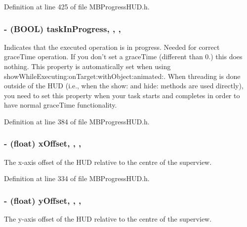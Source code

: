 Definition at line 425 of file M\+B\+Progress\+H\+U\+D.\+h.

\hypertarget{interface_m_b_progress_h_u_d_a6077ea42c37c18b3058ed63ac10ede8f}{
\subsubsection[{task\+In\+Progress}]{\setlength{\rightskip}{0pt plus 5cm}-\/ (B\+O\+O\+L) task\+In\+Progress\hspace{0.3cm}{\ttfamily [read]}, {\ttfamily [write]}, {\ttfamily [atomic]}, {\ttfamily [assign]}}}\label{interface_m_b_progress_h_u_d_a6077ea42c37c18b3058ed63ac10ede8f}
Indicates that the executed operation is in progress. Needed for correct grace\+Time operation. If you don't set a grace\+Time (different than 0.) this does nothing. This property is automatically set when using show\+While\+Executing\+:on\+Target\+:with\+Object\+:animated\+:. When threading is done outside of the H\+U\+D (i.\+e., when the show\+: and hide\+: methods are used directly), you need to set this property when your task starts and completes in order to have normal grace\+Time functionality. 

Definition at line 384 of file M\+B\+Progress\+H\+U\+D.\+h.

\hypertarget{interface_m_b_progress_h_u_d_a4e6ee114c04b90ced1a253a6d33ba785}{
\subsubsection[{x\+Offset}]{\setlength{\rightskip}{0pt plus 5cm}-\/ (float) x\+Offset\hspace{0.3cm}{\ttfamily [read]}, {\ttfamily [write]}, {\ttfamily [atomic]}, {\ttfamily [assign]}}}\label{interface_m_b_progress_h_u_d_a4e6ee114c04b90ced1a253a6d33ba785}
The x-\/axis offset of the H\+U\+D relative to the centre of the superview. 

Definition at line 334 of file M\+B\+Progress\+H\+U\+D.\+h.

\hypertarget{interface_m_b_progress_h_u_d_ad526ffcabab5131697eb0850c50ab1f4}{
\subsubsection[{y\+Offset}]{\setlength{\rightskip}{0pt plus 5cm}-\/ (float) y\+Offset\hspace{0.3cm}{\ttfamily [read]}, {\ttfamily [write]}, {\ttfamily [atomic]}, {\ttfamily [assign]}}}\label{interface_m_b_progress_h_u_d_ad526ffcabab5131697eb0850c50ab1f4}
The y-\/axis offset of the H\+U\+D relative to the centre of the superview. 

